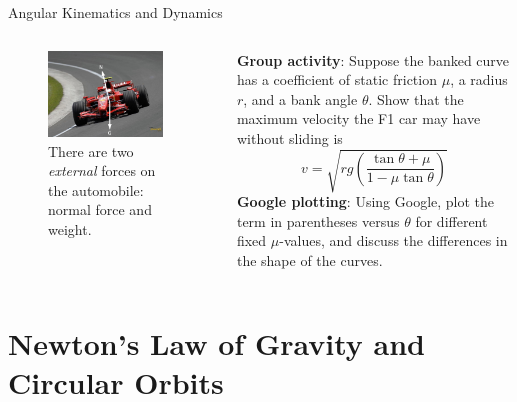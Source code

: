 \documentclass{beamer}
\begin{document}
\begin{frame}{Angular Kinematics and Dynamics}
\begin{columns}[T]
\begin{column}{0.5\textwidth}
\begin{figure}
\centering
\includegraphics[width=0.9\textwidth]{figures/ferari.pdf}
\caption{\label{fig:ferari2} There are two \alert{\textit{external}} forces on the automobile: normal force and weight.}
\end{figure}
\end{column}
\begin{column}{0.5\textwidth}
\small
\textbf{Group activity}: Suppose the banked curve has a coefficient of static friction $\mu$, a radius $r$, and a bank angle $\theta$.  Show that the maximum velocity the F1 car may have without sliding is 
\begin{equation}
v = \sqrt{rg\left(\frac{\tan\theta+\mu}{1-\mu\tan\theta}\right)}
\end{equation}
\textbf{Google plotting}: Using Google, plot the term in parentheses versus $\theta$ for different fixed $\mu$-values, and discuss the differences in the shape of the curves.
\end{column}
\end{columns}
\end{frame}

\section{Newton's Law of Gravity and Circular Orbits}
\end{document}
